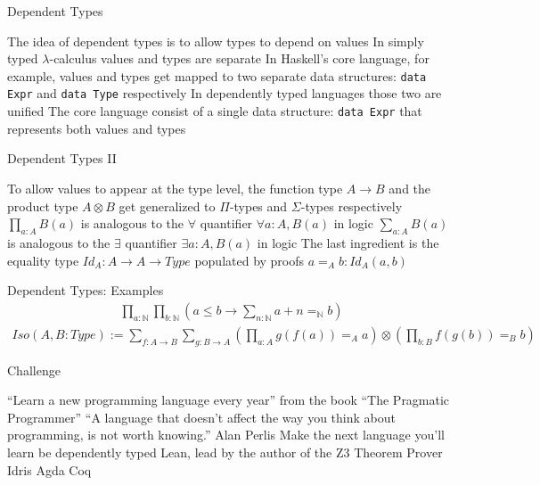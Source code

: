 \documentclass[pdf]{beamer}
\begin{document}
\begin{frame}{Dependent Types}
  \begin{outline}
    \1 The idea of dependent types is to allow types to depend on values
    \pause
    \1 In simply typed $\lambda$-calculus values and types are separate
    \pause
    \1 In Haskell's core language, for example, values and types get mapped to two separate data structures: \texttt{data Expr} and \texttt{data Type} respectively
    \pause
    \1 In dependently typed languages those two are unified
    \pause
    \1 The core language consist of a single data structure: \texttt{data Expr} that represents both values and types
  \end{outline}
\end{frame}

\begin{frame}{Dependent Types II}
  \begin{outline}
    \1 To allow values to appear at the type level, the function type $A \to B$ and the product type $A \otimes B$ get generalized to $\Pi$-types and $\Sigma$-types respectively
    \pause
    \1 $\prod_{a : A}{B(a)}$ is analogous to the $\forall$ quantifier $\forall a : A, B(a)$ in logic
    \1 $\sum_{a : A}{B(a)}$ is analogous to the $\exists$ quantifier $\exists a : A, B(a)$ in logic
    \pause
    \1 The last ingredient is the equality type $Id_{A} : A \to A \to Type$ populated by proofs $a =_{A} b : Id_{A}(a, b)$
  \end{outline}
\end{frame}

\begin{frame}{Dependent Types: Examples}
  \pause
  \begin{align*}
    \prod_{a : \mathbb{N}} \prod_{b: \mathbb{N}} (a \leq b \to \sum_{n:\mathbb{N}} a + n =_{\mathbb{N}} b)
  \end{align*}
  \pause
  \begin{align*}
    Iso(A, B : Type) := \sum_{f : A \to B}\sum_{g : B \to A} (\prod_{a : A}{g(f(a)) =_{A} a}) \otimes (\prod_{b : B}{f(g(b)) =_{B} b})
  \end{align*}
  \begin{outline}
  \end{outline}
\end{frame}

\begin{frame}{Challenge}
  \begin{outline}
    \1 ``Learn a new programming language every year'' from the book ``The Pragmatic Programmer''
    \pause
    \1 ``A language that doesn't affect the way you think about programming, is not worth knowing.'' Alan Perlis
    \pause
    \1 Make the next language you'll learn be dependently typed
    \pause
    \2 Lean, lead by the author of the Z3 Theorem Prover
    \pause
    \2 Idris
    \pause
    \2 Agda
    \pause
    \2 Coq
  \end{outline}
\end{frame}
\end{document}
